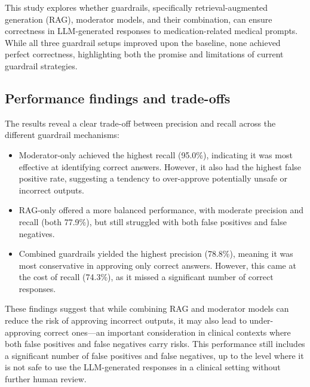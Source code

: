 %

This study explores whether guardrails, specifically retrieval-augmented generation (RAG), moderator models, and their combination, can ensure correctness in LLM-generated responses to medication-related medical prompts.
While all three guardrail setups improved upon the baseline, none achieved perfect correctness, highlighting both the promise and limitations of current guardrail strategies.

\subsection{Performance findings and trade-offs}
The results reveal a clear trade-off between precision and recall across the different guardrail mechanisms:

\begin{itemize}
\item Moderator-only achieved the highest recall (95.0\%), indicating it was most effective at identifying correct answers.
    However, it also had the highest false positive rate, suggesting a tendency to over-approve potentially unsafe or incorrect outputs.
\item RAG-only offered a more balanced performance, with moderate precision and recall (both 77.9\%), but still struggled with both false positives and false negatives.
\item Combined guardrails yielded the highest precision (78.8\%), meaning it was most conservative in approving only correct answers.
    However, this came at the cost of recall (74.3\%), as it missed a significant number of correct responses.
\end{itemize}
These findings suggest that while combining RAG and moderator models can reduce the risk of approving incorrect outputs, it may also lead to under-approving correct ones—an important consideration in clinical contexts where both false positives and false negatives carry risks.
This performance still includes a significant number of false positives and false negatives, up to the level where it is not safe to use the LLM-generated responses in a clinical setting without further human review.

